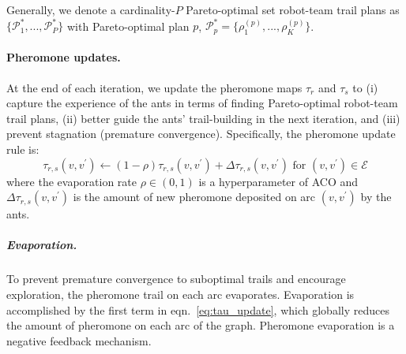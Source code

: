 \documentclass[11pt, oneside]{article}
\begin{document}
Generally, we denote a cardinality-$P$ Pareto-optimal set robot-team trail plans as $\{\mathcal{P}_1^*, ..., \mathcal{P}_P^*\}$ with Pareto-optimal plan $p$, $\mathcal{P}^*_p=\{\rho_1^{(p)}, ..., \rho_K^{(p)}\}$.


\paragraph{Pheromone updates.} At the end of each iteration, we update the pheromone maps $\tau_r$ and $\tau_s$ to (i) capture the experience of the ants in terms of finding Pareto-optimal robot-team trail plans, (ii) better guide the ants' trail-building in the next iteration, and (iii) prevent stagnation (premature convergence). Specifically, the pheromone update rule is:
\begin{equation}
	\tau_{r, s}(v, v^\prime) \leftarrow (1-\rho) \tau_{r,s}(v, v^\prime)  + \Delta \tau_{r,s}(v, v^\prime) \text{ for } (v, v^\prime) \in \mathcal{E} \label{eq:tau_update}
\end{equation}
where the evaporation rate $\rho \in (0, 1)$ is a hyperparameter of ACO and $\Delta \tau_{r,s}(v, v^\prime)$ is the amount of new pheromone deposited on arc $(v, v^\prime)$ by the ants.

\subparagraph{Evaporation.} To prevent premature convergence to suboptimal trails and encourage exploration, the pheromone trail on each arc evaporates. 
Evaporation is accomplished by the first term in eqn.~\ref{eq:tau_update}, which globally reduces the amount of pheromone on each arc of the graph. 
Pheromone evaporation is a negative feedback mechanism. 
\end{document}
